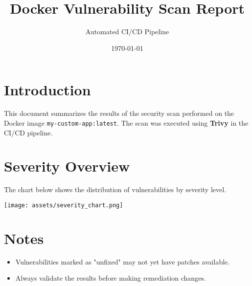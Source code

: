 \documentclass[a4paper,12pt]{article}
\title{Docker Vulnerability Scan Report}
\author{Automated CI/CD Pipeline}
\date{\today}
\begin{document}
\maketitle

\section*{Introduction}
This document summarizes the results of the security scan performed on the Docker image
\texttt{my-custom-app:latest}. The scan was executed using \textbf{Trivy} in the CI/CD pipeline.

\section*{Severity Overview}
The chart below shows the distribution of vulnerabilities by severity level.

\begin{center}
    \texttt{[image: assets/severity\_chart.png]}
\end{center}



\section*{Notes}
\begin{itemize}
    \item Vulnerabilities marked as "unfixed" may not yet have patches available.
    \item Always validate the results before making remediation changes.
\end{itemize}
\end{document}
